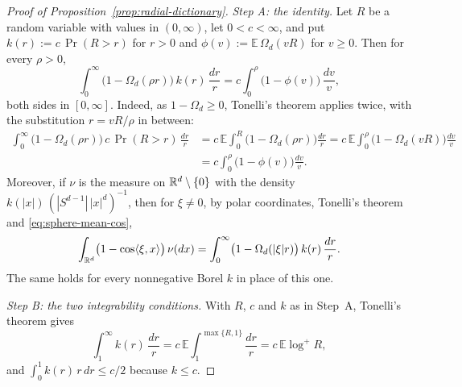\begin{proof}[Proof of Proposition~\ref{prop:radial-dictionary}]
\emph{Step A: the identity.} Let $R$ be a random variable with values in $(0,\infty)$, let
$0 < c < \infty$, and put $k(r) := c\,\Pr(R > r)$ for $r > 0$ and
$\phi(v) := \mathbb{E}\,\Omega_d(vR)$ for $v \ge 0$. Then for every $\rho > 0$,
\begin{equation}\label{eq:dictionary-identity}
  \int_0^\infty\bigl(1 - \Omega_d(\rho r)\bigr)\,k(r)\,\frac{dr}{r}
   = c\int_0^\rho\bigl(1 - \phi(v)\bigr)\,\frac{dv}{v} ,
\end{equation}
both sides in $[0,\infty]$. Indeed, as $1 - \Omega_d \ge 0$, Tonelli's theorem applies twice, with
the substitution $r = vR/\rho$ in between:
\[
\begin{aligned}
  \int_0^\infty\bigl(1 - \Omega_d(\rho r)\bigr)\,c\,\Pr(R > r)\,\frac{dr}{r}
   &= c\,\mathbb{E}\int_0^R\bigl(1 - \Omega_d(\rho r)\bigr)\frac{dr}{r}
   = c\,\mathbb{E}\int_0^\rho\bigl(1 - \Omega_d(vR)\bigr)\frac{dv}{v} \\
   &= c\int_0^\rho\bigl(1 - \phi(v)\bigr)\frac{dv}{v} .
\end{aligned}
\]
Moreover, if $\nu$ is the measure on $\mathbb{R}^d \setminus \{0\}$ with the density
$k(|x|)\,(|S^{d-1}|\,|x|^d)^{-1}$, then for $\xi \ne 0$, by polar coordinates, Tonelli's theorem
and \ref{eq:sphere-mean-cos},
\begin{equation}\label{eq:dictionary-polar}
  \int_{\mathbb{R}^d}\bigl(1 - \cos\langle\xi,x\rangle\bigr)\,\nu(dx)
   = \int_0^\infty\bigl(1 - \Omega_d(|\xi| r)\bigr)\,k(r)\,\frac{dr}{r} .
\end{equation}
The same holds for every nonnegative Borel $k$ in place of this one.

\emph{Step B: the two integrability conditions.} With $R$, $c$ and $k$ as in Step~A, Tonelli's
theorem gives
\[
  \int_1^\infty k(r)\,\frac{dr}{r} = c\,\mathbb{E}\int_1^{\max\{R,1\}}\frac{dr}{r}
   = c\,\mathbb{E}\log^+R ,
\]
and $\int_0^1 k(r)\,r\,dr \le c/2$ because $k \le c$.


\end{proof}
